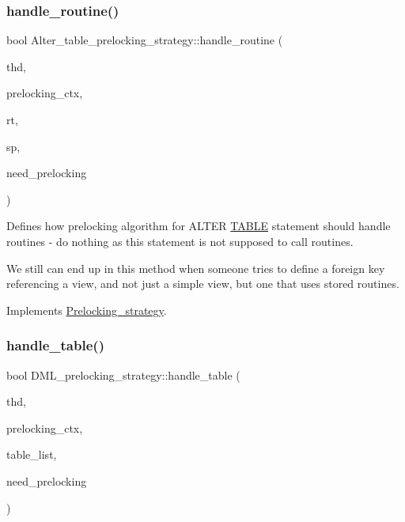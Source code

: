 \subsubsection{\texorpdfstring{handle\+\_\+routine()}{handle\_routine()}\hspace{0.1cm}{\footnotesize\ttfamily [2/2]}}
{\footnotesize\ttfamily bool Alter\+\_\+table\+\_\+prelocking\+\_\+strategy\+::handle\+\_\+routine (\begin{DoxyParamCaption}\item[{T\+HD $\ast$}]{thd,  }\item[{Query\+\_\+tables\+\_\+list $\ast$}]{prelocking\+\_\+ctx,  }\item[{\mbox{\hyperlink{classSroutine__hash__entry}{Sroutine\+\_\+hash\+\_\+entry}} $\ast$}]{rt,  }\item[{\mbox{\hyperlink{classsp__head}{sp\+\_\+head}} $\ast$}]{sp,  }\item[{bool $\ast$}]{need\+\_\+prelocking }\end{DoxyParamCaption})\hspace{0.3cm}{\ttfamily [virtual]}}

Defines how prelocking algorithm for A\+L\+T\+ER \mbox{\hyperlink{structTABLE}{T\+A\+B\+LE}} statement should handle routines -\/ do nothing as this statement is not supposed to call routines.

We still can end up in this method when someone tries to define a foreign key referencing a view, and not just a simple view, but one that uses stored routines. 

Implements \mbox{\hyperlink{classPrelocking__strategy}{Prelocking\+\_\+strategy}}.

\mbox{\label{group__Data__Dictionary_gab4041a333019fb1a8ffb4e3772f627cf}} 
\subsubsection{\texorpdfstring{handle\+\_\+table()}{handle\_table()}\hspace{0.1cm}{\footnotesize\ttfamily [1/2]}}
{\footnotesize\ttfamily bool D\+M\+L\+\_\+prelocking\+\_\+strategy\+::handle\+\_\+table (\begin{DoxyParamCaption}\item[{T\+HD $\ast$}]{thd,  }\item[{Query\+\_\+tables\+\_\+list $\ast$}]{prelocking\+\_\+ctx,  }\item[{\mbox{\hyperlink{structTABLE__LIST}{T\+A\+B\+L\+E\+\_\+\+L\+I\+ST}} $\ast$}]{table\+\_\+list,  }\item[{bool $\ast$}]{need\+\_\+prelocking }\end{DoxyParamCaption})\hspace{0.3cm}{\ttfamily [virtual]}}

